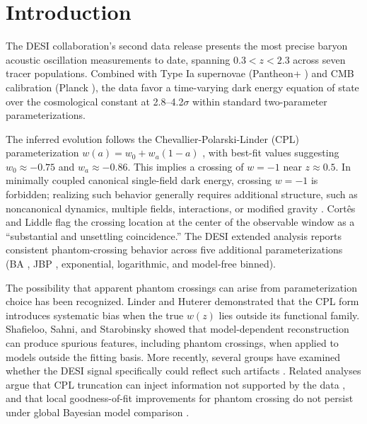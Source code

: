 \documentclass[
  aps,
  prd,
  onecolumn,         %
  nofootinbib,
  longbibliography
]{revtex4-2}
\begin{document}

\section{Introduction}\label{sec:intro}

The DESI collaboration's second data release \cite{ref1} presents the most
precise baryon acoustic oscillation measurements to date, spanning
$0.3 < z < 2.3$ across seven tracer populations. Combined
with Type Ia supernovae (Pantheon+ \cite{ref2}) and CMB calibration (Planck
\cite{ref3}), the data favor a time-varying dark energy equation of state
over the cosmological constant at 2.8--4.2$\sigma$ within standard
two-parameter parameterizations.

The inferred evolution follows the Chevallier-Polarski-Linder (CPL)
parameterization $w(a) = w_0 + w_a(1-a)$ \cite{ref4,ref5}, with best-fit values
suggesting $w_0 \approx -0.75$ and $w_a \approx -0.86$. This implies a crossing of
$w = -1$ near $z \approx 0.5$. In minimally coupled canonical single-field dark
energy, crossing $w = -1$ is forbidden; realizing such behavior generally
requires additional structure, such as noncanonical dynamics, multiple
fields, interactions, or modified gravity \cite{ref6,ref7}. Cort\^{e}s and Liddle
\cite{ref8} flag the crossing location at the center of the observable
window as a ``substantial and unsettling coincidence.'' The DESI
extended analysis \cite{ref9} reports consistent phantom-crossing behavior
across five additional parameterizations (BA \cite{ref10}, JBP \cite{ref11},
exponential, logarithmic, and model-free binned).

The possibility that apparent phantom crossings can arise from
parameterization choice has been recognized. Linder and Huterer \cite{ref12}
demonstrated that the CPL form introduces systematic bias when the true
$w(z)$ lies outside its functional family. Shafieloo, Sahni, and
Starobinsky \cite{ref13} showed that model-dependent reconstruction can
produce spurious features, including phantom crossings, when applied to
models outside the fitting basis. More recently, several groups have
examined whether the DESI signal specifically could reflect such
artifacts \cite{ref8,ref14}. Related analyses argue that CPL truncation
can inject information not supported by the data \cite{ref21}, and that
local goodness-of-fit improvements for phantom crossing do not persist
under global Bayesian model comparison \cite{ref22}.
\end{document}
